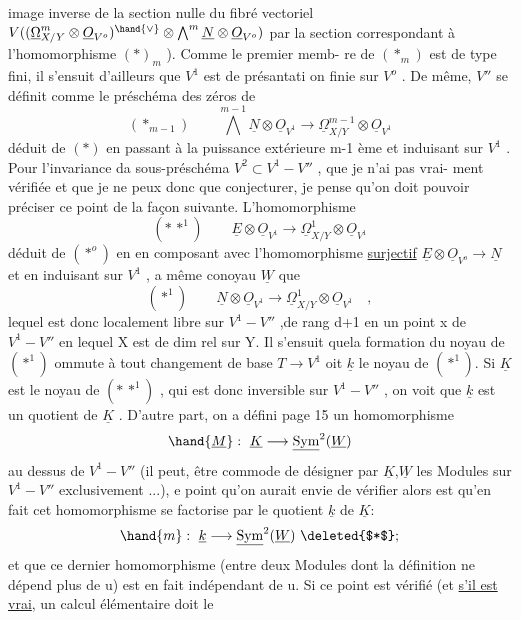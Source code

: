 
image inverse de la section nulle du fibré vectoriel $V((\underline{\Omega}^m_{X/Y}\otimes\underline{O}_{V^o})^{\hand{\vee}}\otimes\bigwedge^m\underline{N}\otimes\underline{O}_{V^o})$
par la section correspondant à l'homomorphisme $(*)_{m}$ ). Comme le premier memb-%
re de $(*_m)$ est de type fini, il s'ensuit d'ailleurs que $V^1$ est de présantati%
on finie sur $V^o$ . De même, $V''$ se définit comme le préschéma des zéros de
\[ (*_{m-1}) \qquad \bigwedge^{m-1}\underline{N}\otimes\underline{O}_{V^1} \longrightarrow \underline{\Omega}^{m-1}_{X/Y}\otimes\underline{O}_{V^1} \]
déduit de $(*)$ en passant à la puissance extérieure m-1 ème et induisant sur
$V^1$ . Pour l'invariance da sous-préschéma $V^2\subset V^1-V''$ , que je n'ai pas vrai-%
ment vérifiée et que je ne peux donc que conjecturer, je pense qu'on doit
pouvoir préciser ce point de la façon suivante. L'homomorphisme
\[ (*\,*^1) \qquad \underline{E}\otimes\underline{O}_{V^1}\longrightarrow\underline{\Omega}^1_{X/Y}\otimes\underline{O}_{V^1} \]
déduit de $(*^o)$ en  en composant avec l'homomorphisme
\uline{surjectif} $\underline{E}\otimes\underline{O}_{V^o}\to\underline{N}$ et en  induisant sur $V^1$ , a même conoyau
$\underline{W}$ que
\[ (*^1) \qquad \underline{N}\otimes\underline{O}_{V^1}\to\underline{\Omega}^1_{X/Y}\otimes\underline{O}_{V^1} \quad , \]
lequel  est donc localement libre sur $V^1-V''$ ,\hand{(}de rang d+1 en un point
x de $V^1-V''$ en lequel X est de dim rel  sur Y\hand{)}. Il s'ensuit quela formation
du noyau de $(*^1)$ ommute à tout changement de base $T\to V^1$ oit $\underline{k}$ le
noyau de $(*^1)$. Si $\underline{K}$ est le noyau de $(*\,*^1)$ , qui est donc inversible sur
$V^1-V''$ , on voit  que $\underline{k}$ est un quotient de $\underline{K}$ . D'autre part, on a défini
page 15 un homomorphisme
\[ \hand{\underline{M}} : \ \underline{K}\longrightarrow\underline{\mathrm{Sym}}^2(\underline{W}) \]
au dessus de $V^1-V''$ (il peut, être commode de désigner par $\underline{K}$,$\underline{W}$ les Modules
sur $V^1-V''$ exclusivement ...),  e point qu'on aurait envie de vérifier
alors est qu'en fait cet homomorphisme se factorise par le quotient $\underline{k}$ de $\underline{K}$:
\[ \hand{m} : \ \underline{k}\longrightarrow\underline{\mathrm{Sym}}^2(\underline{W}) \ \deleted{$*$} ; \]
et que ce dernier homomorphisme (entre deux Modules dont la définition ne
 dépend plus de u) est en fait indépendant de
u. Si ce point est vérifié (et \uline{s'il est vrai}, un calcul élémentaire doit le

